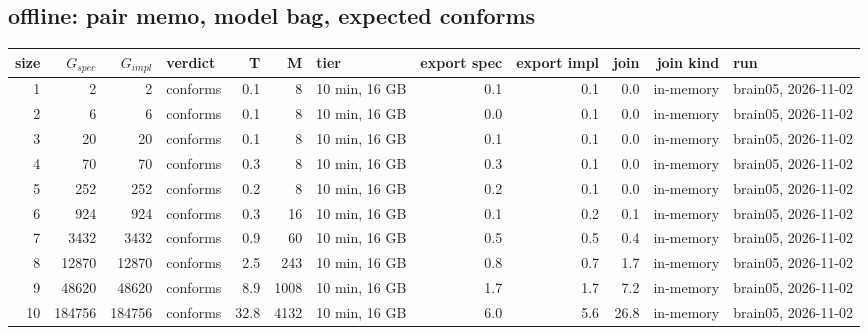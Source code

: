 \documentclass[10pt]{article}
\begin{document}
\subsection*{offline: pair \textsf{memo}, model bag, expected conforms}
\begin{longtable}{@{}rrrlrrlrrrrl@{}}
\toprule
size & $G_{\mathit{spec}}$ & $G_{\mathit{impl}}$ & verdict & T & M & tier & export spec & export impl & join & join kind & run \\
\midrule
\endhead
\color{red} 1 & 2 & 2 & conforms & 0.1 & 8 & 10 min, 16 GB & 0.1 & 0.1 & 0.0 & in-memory & brain05, 2026-11-02 \\
\color{red} 2 & 6 & 6 & conforms & 0.1 & 8 & 10 min, 16 GB & 0.0 & 0.1 & 0.0 & in-memory & brain05, 2026-11-02 \\
\color{red} 3 & 20 & 20 & conforms & 0.1 & 8 & 10 min, 16 GB & 0.1 & 0.1 & 0.0 & in-memory & brain05, 2026-11-02 \\
\color{red} 4 & 70 & 70 & conforms & 0.3 & 8 & 10 min, 16 GB & 0.3 & 0.1 & 0.0 & in-memory & brain05, 2026-11-02 \\
\color{red} 5 & 252 & 252 & conforms & 0.2 & 8 & 10 min, 16 GB & 0.2 & 0.1 & 0.0 & in-memory & brain05, 2026-11-02 \\
\color{red} 6 & 924 & 924 & conforms & 0.3 & 16 & 10 min, 16 GB & 0.1 & 0.2 & 0.1 & in-memory & brain05, 2026-11-02 \\
\color{red} 7 & 3432 & 3432 & conforms & 0.9 & 60 & 10 min, 16 GB & 0.5 & 0.5 & 0.4 & in-memory & brain05, 2026-11-02 \\
\color{red} 8 & 12870 & 12870 & conforms & 2.5 & 243 & 10 min, 16 GB & 0.8 & 0.7 & 1.7 & in-memory & brain05, 2026-11-02 \\
\color{red} 9 & 48620 & 48620 & conforms & 8.9 & 1008 & 10 min, 16 GB & 1.7 & 1.7 & 7.2 & in-memory & brain05, 2026-11-02 \\
\color{red} 10 & 184756 & 184756 & conforms & 32.8 & 4132 & 10 min, 16 GB & 6.0 & 5.6 & 26.8 & in-memory & brain05, 2026-11-02 \\
\bottomrule
\end{longtable}
\end{document}
